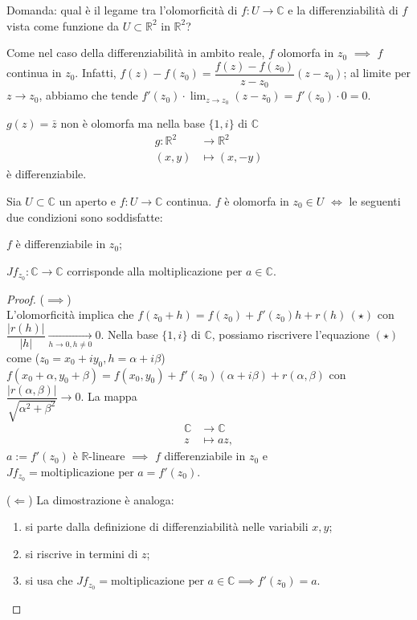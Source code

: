 Domanda: qual è il legame tra l'olomorficità di $f:U \longrightarrow \mathbb{C}$ e la differenziabilità di $f$ vista come funzione da $U \subset \mathbb{R}^2$ in $\mathbb{R}^2$?

\begin{oss}
  Come nel caso della differenziabilità in ambito reale, $f$ olomorfa in $z_0$ $\implies$ $f$ continua in $z_0$. Infatti, $f(z)-f(z_0)=\dfrac{f(z)-f(z_0)}{z-z_0}(z-z_0)$; al limite per $z \longrightarrow z_0$, abbiamo che tende  $\displaystyle f'(z_0) \cdot \lim_{z \longrightarrow z_0} (z-z_0)=f'(z_0) \cdot 0=0$.
\end{oss}

\begin{ex}
  $g(z)=\bar{z}$ non è olomorfa ma nella base $\{1, i\}$ di $\mathbb{C}$
  \begin{align*}
    g: \mathbb{R}^2 &\longrightarrow \mathbb{R}^2\\
    (x, y) &\longmapsto (x, -y)
  \end{align*}
   è differenziabile.
\end{ex}

\begin{thm} \label{car_olo}
  Sia $U \subset \mathbb{C}$ un aperto e $f:U \longrightarrow \mathbb{C}$ continua. $f$ è olomorfa in $z_0 \in U$ $\iff$ le seguenti due condizioni sono soddisfatte:
  \begin{nlist}
    \item $f$ è differenziabile in $z_0$;
    \item $Jf_{z_0}:\mathbb{C} \longrightarrow \mathbb{C}$ corrisponde alla moltiplicazione per $a \in \mathbb{C}$.
  \end{nlist}
\end{thm}

\begin{proof}
  ($\implies$) \\ L'olomorficità implica che $f(z_0+h)=f(z_0)+f'(z_0)h+r(h) \, (\star)$ con \\ $\dfrac{|r(h)|}{|h|} \xrightarrow[h \longrightarrow 0, h \not=0]{} 0$.
  Nella base $\{1, i\}$ di $\mathbb{C}$, possiamo riscrivere l'equazione $(\star)$ come ($z_0=x_0+iy_0, h=\alpha+i\beta$) $f(x_0+\alpha, y_0+\beta)=f(x_0, y_0)+f'(z_0)(\alpha+i\beta)+r(\alpha, \beta)$ con $\dfrac{|r(\alpha, \beta)|}{\sqrt{\alpha^2+\beta^2}} \longrightarrow 0$.
  La mappa
  \begin{align*}
    \mathbb{C} &\longrightarrow \mathbb{C}\\
    z &\longmapsto az,
  \end{align*}
  $a:=f'(z_0)$ è $\mathbb{R}$-lineare $\implies$ $f$ differenziabile in $z_0$ e $Jf_{z_0}=\text{moltiplicazione per }a=f'(z_0)$.

  ($\Leftarrow$) La dimostrazione è analoga:
  \begin{enumerate}
    \item si parte dalla definizione di differenziabilità nelle variabili $x, y$;
    \item si riscrive in termini di $z$;
    \item si usa che $Jf_{z_0}=\text{moltiplicazione per }a \in \mathbb{C} \implies f'(z_0)=a$.
  \end{enumerate}
\end{proof}

